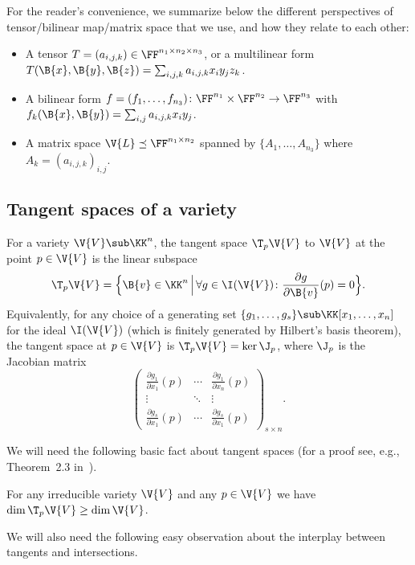 For the reader's convenience, we summarize below the different perspectives of tensor/bilinear map/matrix space that we use, and how they relate to each other:
\begin{itemize}
	\item A tensor $T = (a_{i,j,k}) \in \FF^{n_1\times n_2 \times n_3}$,  
	or a multilinear form $T(\B{x},\B{y},\B{z}) = \sum_{i,j,k} a_{i,j,k}x_iy_jz_k$.
	\item A bilinear form $f=(f_1,\ldots,f_{n_3}) \colon \FF^{n_1} \times \FF^{n_2} \to \FF^{n_3}$ with $f_k(\B{x},\B{y}) = \sum_{i,j} a_{i,j,k}x_iy_j$.
	\item A matrix space $\V{L} \preceq \FF^{n_1 \times n_2}$ spanned by $\{A_1,\ldots,A_{n_3}\}$ where $A_k = (a_{i,j,k})_{i,j}$.
\end{itemize}



\subsection{Tangent spaces of a variety}

For a variety $\V{V} \sub \KK^n$, the tangent space $\T_p\V{V}$ to $\V{V}$ at the point $p \in \V{V}$ is the linear subspace
$$\T_p\V{V} = \Big\{ \B{v} \in \KK^n \,\Big\vert\, \forall g \in \I(\V{V}) \colon \frac{\partial g}{\partial \B{v}}(p) = 0 \Big\}.$$
Equivalently, for any choice of a generating set $\{g_1,\ldots,g_s\} \sub \KK[x_1,\ldots,x_n]$ for the ideal $\I(\V{V})$ (which is finitely generated by Hilbert's basis theorem), the tangent space at $p \in \V{V}$ is $\T_p\V{V} = \ker \J_p$, where $\J_p$ is the Jacobian matrix
$$\begin{pmatrix}
	\frac{\partial{g_1}}{\partial x_1}(p) & \cdots & \frac{\partial{g_1}}{\partial x_n}(p) \\
	\vdots  & \ddots & \vdots  \\
	\frac{\partial{g_s}}{\partial x_1}(p) & \cdots & \frac{\partial{g_s}}{\partial x_1}(p) 
\end{pmatrix}_{s\times n} .$$

We will need the following basic fact about tangent spaces (for a proof see, e.g., Theorem~2.3 in~\cite{Shafarevich}).
\begin{fact}\label{fact:dim-tangent}
	For any irreducible variety $\V{V}$ and any $p \in \V{V}$ we have
	$\dim \T_p \V{V} \ge \dim \V{V}$.
\end{fact}


We will also need the following easy observation about the interplay between tangents and intersections.

